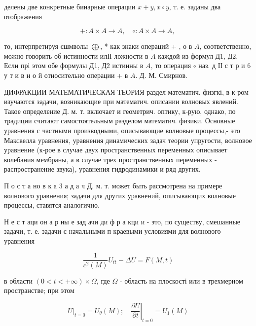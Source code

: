 \documentclass[10pt]{article}
\begin{document}
делены две конкретные бинарные операции $x+y, x \circ y$, т. е. заданы два отображения



\[

+: A \times A \longrightarrow A, \quad \circ: A \times A \longrightarrow A \text {, }

\]



то, интерпретируя сшмволы $\bigoplus$, * как знаки операций + , о в $A$, соответственно, можно говорить об истинности илІІ ложности в $A$ каждой из формул Д1, Д2. Если прі этом обе формулы Д1, Д2 истинны в $A$, то операция $\circ$ наз. д ІІ с т р и 6 у т и в н о й относительно операции + в $A$. Д. М. Смирнов.



ДИФРАКЦИИ МАТЕМАТИЧЕСКАЯ ТЕОРИЯ раздел математич. физгкі, в к-ром изучаются задачи, возникающие при математич. описании волновых явлений. Такое определение Д. м. т. включает и геометрич. оптику, к-рую, однако, по традиции считают самостоятельным разделом математич. физики. Основные уравнения с частными производными, описывающие волновые процессы,- это Максвелла уравнения, уравнения динамических задач теории упругости, волновое уравнение (к-рое в случае двух пространственных переменных описывает колебания мембраны, а в случае трех пространственных переменных - распространение звука), уравнения гидродинамики и ряд других.



П о с т а но в к а 3 а д а ч Д. м. т. может быть рассмотрена на примере волнового уравнения; задачи для других уравнений, описывающих волновые процессы, ставятся аналогично.



Н е с т аци он а р ны е зад ачи ди ф р а кци и - это, по существу, смешанные задачи, т. е. задачи с начальными п краевыми условиями для волнового уравнения



\[

\frac{1}{c^{2}(M)} U_{t t}-\Delta U=F(M, t)

\]



в области $(0<t<+\infty) \times \Omega$, где $\Omega$ - область на плоскості или в трехмерном пространстве; при этом



\[

\left.U\right|_{t=0}=U_{\theta}(M) ;\left.\quad \frac{\partial U}{\partial t}\right|_{t=0}=U_{1}(M)

\]
\end{document}
